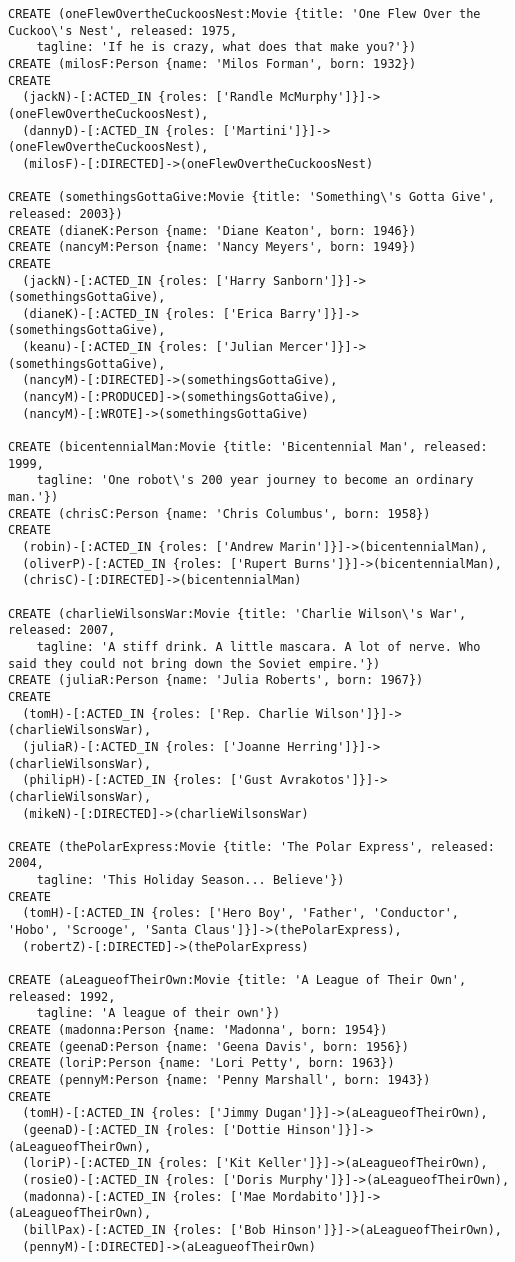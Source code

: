 \begin{lstlisting}
CREATE (oneFlewOvertheCuckoosNest:Movie {title: 'One Flew Over the Cuckoo\'s Nest', released: 1975,
    tagline: 'If he is crazy, what does that make you?'})
CREATE (milosF:Person {name: 'Milos Forman', born: 1932})
CREATE
  (jackN)-[:ACTED_IN {roles: ['Randle McMurphy']}]->(oneFlewOvertheCuckoosNest),
  (dannyD)-[:ACTED_IN {roles: ['Martini']}]->(oneFlewOvertheCuckoosNest),
  (milosF)-[:DIRECTED]->(oneFlewOvertheCuckoosNest)

CREATE (somethingsGottaGive:Movie {title: 'Something\'s Gotta Give', released: 2003})
CREATE (dianeK:Person {name: 'Diane Keaton', born: 1946})
CREATE (nancyM:Person {name: 'Nancy Meyers', born: 1949})
CREATE
  (jackN)-[:ACTED_IN {roles: ['Harry Sanborn']}]->(somethingsGottaGive),
  (dianeK)-[:ACTED_IN {roles: ['Erica Barry']}]->(somethingsGottaGive),
  (keanu)-[:ACTED_IN {roles: ['Julian Mercer']}]->(somethingsGottaGive),
  (nancyM)-[:DIRECTED]->(somethingsGottaGive),
  (nancyM)-[:PRODUCED]->(somethingsGottaGive),
  (nancyM)-[:WROTE]->(somethingsGottaGive)

CREATE (bicentennialMan:Movie {title: 'Bicentennial Man', released: 1999,
    tagline: 'One robot\'s 200 year journey to become an ordinary man.'})
CREATE (chrisC:Person {name: 'Chris Columbus', born: 1958})
CREATE
  (robin)-[:ACTED_IN {roles: ['Andrew Marin']}]->(bicentennialMan),
  (oliverP)-[:ACTED_IN {roles: ['Rupert Burns']}]->(bicentennialMan),
  (chrisC)-[:DIRECTED]->(bicentennialMan)

CREATE (charlieWilsonsWar:Movie {title: 'Charlie Wilson\'s War', released: 2007,
    tagline: 'A stiff drink. A little mascara. A lot of nerve. Who said they could not bring down the Soviet empire.'})
CREATE (juliaR:Person {name: 'Julia Roberts', born: 1967})
CREATE
  (tomH)-[:ACTED_IN {roles: ['Rep. Charlie Wilson']}]->(charlieWilsonsWar),
  (juliaR)-[:ACTED_IN {roles: ['Joanne Herring']}]->(charlieWilsonsWar),
  (philipH)-[:ACTED_IN {roles: ['Gust Avrakotos']}]->(charlieWilsonsWar),
  (mikeN)-[:DIRECTED]->(charlieWilsonsWar)

CREATE (thePolarExpress:Movie {title: 'The Polar Express', released: 2004,
    tagline: 'This Holiday Season... Believe'})
CREATE
  (tomH)-[:ACTED_IN {roles: ['Hero Boy', 'Father', 'Conductor', 'Hobo', 'Scrooge', 'Santa Claus']}]->(thePolarExpress),
  (robertZ)-[:DIRECTED]->(thePolarExpress)

CREATE (aLeagueofTheirOwn:Movie {title: 'A League of Their Own', released: 1992,
    tagline: 'A league of their own'})
CREATE (madonna:Person {name: 'Madonna', born: 1954})
CREATE (geenaD:Person {name: 'Geena Davis', born: 1956})
CREATE (loriP:Person {name: 'Lori Petty', born: 1963})
CREATE (pennyM:Person {name: 'Penny Marshall', born: 1943})
CREATE
  (tomH)-[:ACTED_IN {roles: ['Jimmy Dugan']}]->(aLeagueofTheirOwn),
  (geenaD)-[:ACTED_IN {roles: ['Dottie Hinson']}]->(aLeagueofTheirOwn),
  (loriP)-[:ACTED_IN {roles: ['Kit Keller']}]->(aLeagueofTheirOwn),
  (rosieO)-[:ACTED_IN {roles: ['Doris Murphy']}]->(aLeagueofTheirOwn),
  (madonna)-[:ACTED_IN {roles: ['Mae Mordabito']}]->(aLeagueofTheirOwn),
  (billPax)-[:ACTED_IN {roles: ['Bob Hinson']}]->(aLeagueofTheirOwn),
  (pennyM)-[:DIRECTED]->(aLeagueofTheirOwn)


\end{lstlisting}
